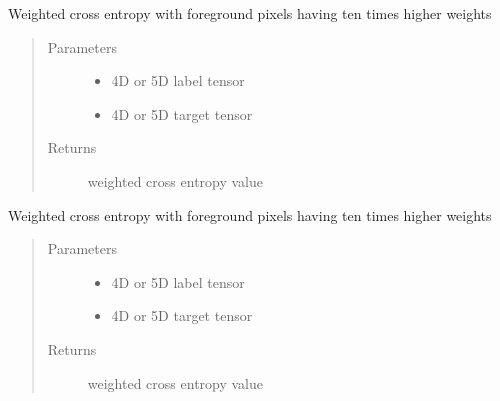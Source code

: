 \documentclass[letterpaper,10pt,english]{sphinxmanual}
\begin{document}
\begin{fulllineitems}
\label{\detokenize{index:boundary.loss.weighted_cross_entropy}}
Weighted cross entropy with foreground pixels having ten times higher weights
\begin{quote}\begin{description}
\item[{Parameters}] \leavevmode\begin{itemize}
\item {} 
 \textendash{} 4D or 5D label tensor

\item {} 
 \textendash{} 4D or 5D target tensor

\end{itemize}

\item[{Returns}] \leavevmode
weighted cross entropy value

\end{description}\end{quote}

\end{fulllineitems}


\begin{fulllineitems}
\label{\detokenize{index:boundary.loss.weighted_cross_entropy_with_boundary}}
Weighted cross entropy with foreground pixels having ten times higher weights
\begin{quote}\begin{description}
\item[{Parameters}] \leavevmode\begin{itemize}
\item {} 
 \textendash{} 4D or 5D label tensor

\item {} 
 \textendash{} 4D or 5D target tensor

\end{itemize}

\item[{Returns}] \leavevmode
weighted cross entropy value

\end{description}\end{quote}

\end{fulllineitems}
\end{document}
